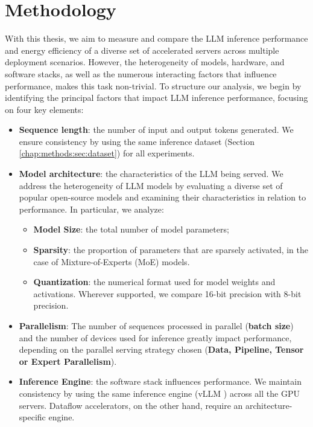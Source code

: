 \chapter{Methodology}
\label{chap:methods}

With this thesis, we aim to measure and compare the LLM inference performance and energy efficiency of a diverse set of accelerated servers across multiple deployment scenarios. However, the heterogeneity of models, hardware, and software stacks, as well as the numerous interacting factors that influence performance, makes this task non-trivial. To structure our analysis, we begin by identifying the principal factors that impact LLM inference performance, focusing on four key elements:

\begin{itemize}
\item \textbf{Sequence length}: the number of input and output tokens generated. We ensure consistency by using the same inference dataset (Section \ref{chap:methods:sec:dataset}) for all experiments.
\item \textbf{Model architecture}: the characteristics of the LLM being served. We address the heterogeneity of LLM models by evaluating a diverse set of popular open-source models and examining their characteristics in relation to performance. In particular, we analyze:
\begin{itemize}
\item \textbf{Model Size}: the total number of model parameters;
\item \textbf{Sparsity}: the proportion of parameters that are sparsely activated, in the case of Mixture-of-Experts (MoE) models.
\item \textbf{Quantization}: the numerical format used for model weights and activations. Wherever supported, we compare 16-bit precision with 8-bit precision.
\end{itemize}
\item \textbf{Parallelism}: The number of sequences processed in parallel (\textbf{batch size}) and the number of devices used for inference greatly impact performance, depending on the parallel serving strategy chosen (\textbf{Data, Pipeline, Tensor or Expert Parallelism}).
\item \textbf{Inference Engine}: the software stack influences performance. We maintain consistency by using the same inference engine (vLLM \cite{kwon2023efficient}) across all the GPU servers. Dataflow accelerators, on the other hand, require an architecture-specific engine.
\end{itemize}

